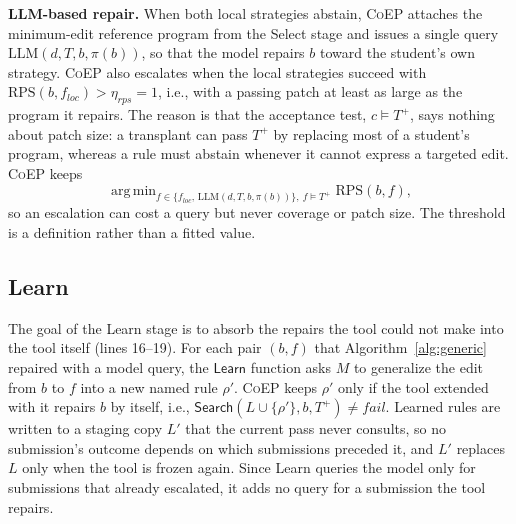 \documentclass[acmsmall,screen,review,anonymous,nonacm]{acmart}
\DeclareMathOperator*{\argmin}{arg\,min}
\newcommand{\tool}{\textsc{CoEP}\xspace}
\newcommand{\aux}[1]{\ensuremath{\mathsf{#1}}}
\newcommand{\V}[1]{\ensuremath{\mathit{#1}}}
\newcommand{\RPS}{\mathrm{RPS}}
\begin{document}
\textbf{LLM-based repair.} When both local strategies abstain, \tool attaches the minimum-edit reference program from the Select stage and issues a single query $\mathrm{LLM}(d, T, b, \pi(b))$, so that the model repairs $b$ toward the student's own strategy. \tool also escalates when the local strategies succeed with $\RPS(b, f_{\V{loc}}) > \eta_{\V{rps}} = 1$, i.e., with a passing patch at least as large as the program it repairs. The reason is that the acceptance test, $c \models T^{+}$, says nothing about patch size: a transplant can pass $T^{+}$ by replacing most of a student's program, whereas a rule must abstain whenever it cannot express a targeted edit. \tool keeps
\[
\argmin_{f \in \{f_{\V{loc}},\, \mathrm{LLM}(d, T, b, \pi(b))\},\ f \models T^{+}} \RPS(b, f),
\]
so an escalation can cost a query but never coverage or patch size. The threshold is a definition rather than a fitted value.

\subsection{Learn}
\label{sec:learn}

The goal of the Learn stage is to absorb the repairs the tool could not make into the tool itself (lines 16--19). For each pair $(b, f)$ that Algorithm~\ref{alg:generic} repaired with a model query, the \aux{Learn} function asks $M$ to generalize the edit from $b$ to $f$ into a new named rule $\rho'$. \tool keeps $\rho'$ only if the tool extended with it repairs $b$ by itself, i.e., $\aux{Search}(L \cup \{\rho'\}, b, T^{+}) \neq \V{fail}$. Learned rules are written to a staging copy $L'$ that the current pass never consults, so no submission's outcome depends on which submissions preceded it, and $L'$ replaces $L$ only when the tool is frozen again. Since Learn queries the model only for submissions that already escalated, it adds no query for a submission the tool repairs.
\end{document}
